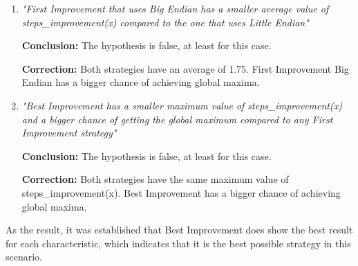 \documentclass{article}
\begin{document}
\begin{enumerate}
    \item \textit{"First Improvement that uses Big Endian has a smaller average value of steps\_improvement(x) compared to the one that uses Little Endian"}
    
    \textbf{Conclusion:} The hypothesis is false, at least for this case.
    
    \textbf{Correction:} Both strategies have an average of 1.75. First Improvement Big Endian has a bigger chance of achieving global maxima.
    
    \item \textit{"Best Improvement has a smaller maximum value of steps\_improvement(x) and a bigger chance of getting the global maximum compared to any First Improvement strategy"}
    
    \textbf{Conclusion:} The hypothesis is false, at least for this case.
    
    \textbf{Correction:} Both strategies have the same maximum value of steps\_improvement(x). Best Improvement has a bigger chance of achieving global maxima.
\end{enumerate}

\bigskip

As the result, it was established that Best Improvement does show the best result for each characteristic, which indicates that it is the best possible strategy in this scenario. 




\end{document}
